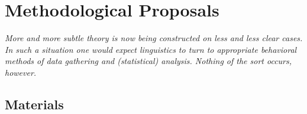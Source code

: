  \section{Methodological Proposals}\label{sec:6.3}

 \epigraph{\itshape More and more subtle theory is now being constructed on less and less clear cases. In such a situation one would expect linguistics to turn to appropriate behavioral methods of data gathering  and (statistical) analysis. Nothing of the sort occurs, however.\\[-2\baselineskip]}{\citep{LeveltEtAl1977}}


 \subsection{Materials} \label{sec:6.3.1}

